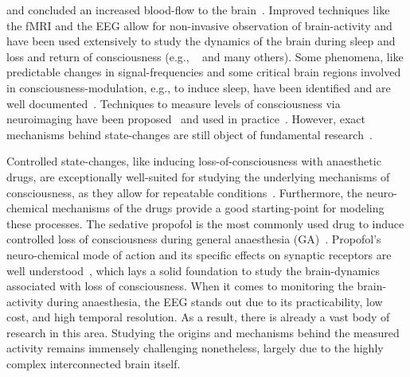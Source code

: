 and concluded an increased blood-flow to the brain~\cite{mosso_ueber_1881}.
Improved techniques like the fMRI and the EEG allow for non-invasive observation of brain-activity and have been
used extensively to study the dynamics of the brain during sleep and loss and return of consciousness
(e.g., ~\cite{murphy_propofol_2011, lee_classification_2017, kuizenga_biphasic_2001, boly_connectivity_2012}
and many others).
Some phenomena, like predictable changes in signal-frequencies and some critical brain regions involved in
consciousness-modulation, e.g., to induce sleep,
have been identified and are well documented~\cite{tantirigama_perspective_2020, wu_neuroscience_2018}.
Techniques to measure levels of consciousness via neuroimaging have been proposed~\cite{sigl_introduction_1994,
    casali_theoretically_2013} and used in practice~\cite{mathur_bispectral_2022}.
However, exact mechanisms behind state-changes are still object of fundamental research~\cite{tantirigama_perspective_2020}.

Controlled state-changes, like inducing loss-of-consciousness with anaesthetic drugs,
are exceptionally well-suited for studying the underlying mechanisms of consciousness,
as they allow for repeatable conditions~\cite{bonhomme_general_2019}.
Furthermore, the neuro-chemical mechanisms of the drugs provide a good starting-point for modeling these processes.
The sedative propofol is the most commonly used drug to induce controlled loss of consciousness
during general anaesthesia (GA)~\cite{miner_clinical_2007}.
Propofol's neuro-chemical mode of action and its specific effects on synaptic receptors
are well understood~\cite{sahinovic_clinical_2018, kitamura_effects_2003},
which lays a solid foundation to study the brain-dynamics associated with loss of consciousness.
When it comes to monitoring the brain-activity during anaesthesia,
the EEG stands out due to its practicability, low cost, and high temporal resolution.
As a result, there is already a vast body of research in this area.
Studying the origins and mechanisms behind the measured activity remains immensely challenging nonetheless,
largely due to the highly complex interconnected brain itself.

